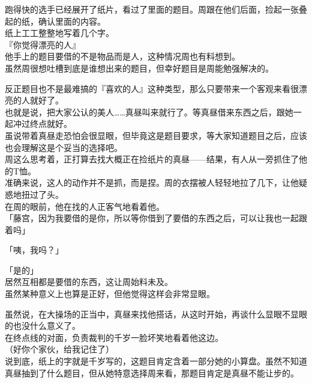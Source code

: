 跑得快的选手已经展开了纸片，看过了里面的题目。周跟在他们后面，捡起一张叠起的纸，确认里面的内容。\\

纸上工工整整地写着几个字。\\

『你觉得漂亮的人』\\

他手上的题目要借的不是物品而是人，这种情况周也有料想到。\\

虽然周很想吐槽到底是谁想出来的题目，但幸好题目是周能勉强解决的。

反正题目也不是最难搞的『喜欢的人』这种类型，那么只要带来一个客观来看很漂亮的人就好了。\\

也就是说，把大家公认的美人……真昼叫来就行了。等真昼借来东西之后，跟她一起冲过终点就好。\\

虽说带着真昼走恐怕会很显眼，但毕竟这是题目要求，等大家知道题目之后，应该也会理解这是个妥当的选择吧。\\

周这么思考着，正打算去找大概正在捡纸片的真昼——结果，有人从一旁抓住了他的T恤。\\

准确来说，这人的动作并不是抓，而是捏。周的衣摆被人轻轻地拉了几下，让他疑惑地扭过了头。\\

在周的眼前，他在找的人正客气地看着他。\\

「藤宫，因为我要借的是你，所以等你借到了要借的东西之后，可以让我也一起跟着吗」

「咦，我吗？」

「是的」\\

居然互相都是要借的东西，这让周始料未及。\\

虽然某种意义上也算是正好，但他觉得这样会非常显眼。

虽然说，在大操场的正当中，真昼来找他搭话，从这时开始，再谈什么显眼不显眼的也没什么意义了。\\

在终点线的对面，负责裁判的千岁一脸坏笑地看着他这边。\\

（好你个家伙，给我记住了）\\

说到底，纸上的字就是千岁写的，这题目肯定含着一部分她的小算盘。虽然不知道真昼抽到了什么题目，但从她特意选择周来看，那题目肯定是真昼不能让步的。\\

